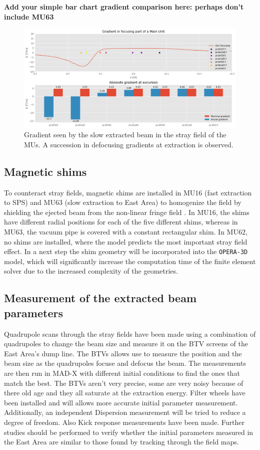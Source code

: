 \documentclass[a4paper,
               biblatex,     %
               keeplastbox,   %
               ]{jacow}
\begin{document}
\textbf{Add your simple bar chart gradient comparison here: perhaps don't include MU63}

\begin{figure}[!htb]
   \centering
   \includegraphics*[width=1.0\columnwidth]{gradient_focusing.png}
   \caption{Gradient seen by the slow extracted beam in the stray field of the MUs. A succession in defocusing gradients at extraction is observed.}
   \label{fig:stray field gradients}
\end{figure}

\subsection{Magnetic shims}

To counteract stray fields, magnetic shims are installed in MU16 (fast extraction to SPS) and MU63 (slow extraction to East Area) to homogenize the field by shielding the ejected beam from the non-linear fringe field \cite{zickler_influence_nodate}. In MU16, the shims have different radial positions for each of the five different shims, whereas in MU63, the vacuum pipe is covered with a constant rectangular shim. In MU62, no shims are installed, where the model predicts the most important stray field effect. In a next step the shim geometry will be incorporated into the \texttt{OPERA-3D} model, which will significantly increase the computation time of the finite element solver due to the increased complexity of the geometries.

\subsection{Measurement of the extracted beam parameters}

Quadrupole scans through the stray fields have been made using a combination of quadrupoles to change the beam size and measure it on the BTV screens of the East Area's dump line. The BTVs allows use to measure the position and the beam size as the quadrupoles focuse and defocus the beam. The measurements are then run in MAD-X with different initial conditions to find the ones that match the best. The BTVs aren't very precise, some are very noisy because of there old age and they all saturate at the extraction energy. Filter wheels have been installed and will allows more accurate initial parameter measurement. Additionally, an independent Dispersion measurement will be tried to reduce a degree of freedom.
Also Kick response measurements have been made. Further studies should be performed to verify whether the initial parameters measured in the East Area are similar to those found by tracking through the field maps.
\end{document}
